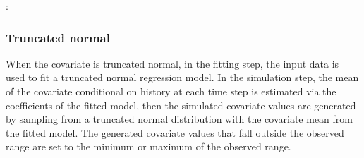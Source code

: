 \documentclass[letterpaper,10pt,english]{sphinxmanual}
\begin{document}
\begin{sphinxVerbatim}[commandchars=\\\{\}]
        
         
      \PYG{p}{[} \PYG{p}{]}
      \PYG{p}{[} \PYG{p}{]}
      
      
\end{sphinxVerbatim}

\sphinxAtStartPar
{}:
\begin{quote}

\end{quote}


\subsubsection{Truncated normal}
\label{\detokenize{Specifications/Covariate model:truncated-normal}}
\sphinxAtStartPar
When the covariate is truncated normal, in the fitting step, the input data
is used to fit a truncated normal regression model. In the simulation step, the mean of the covariate conditional on history at each time step is estimated via the coefficients of the
fitted model, then the simulated covariate values are generated by sampling from a truncated normal
distribution with the covariate mean from the fitted model. The generated covariate values that fall outside the observed range
are set to the minimum or maximum of the observed range.
\end{document}
